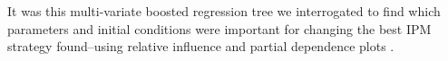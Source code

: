 \documentclass[12pt, a4paper]{article}
\begin{document}
It was this multi-variate boosted regression tree we interrogated to find which parameters and initial conditions were important for changing the best IPM strategy found--using relative influence and partial dependence plots \citep{Mill2016}.    


 
\end{document}
